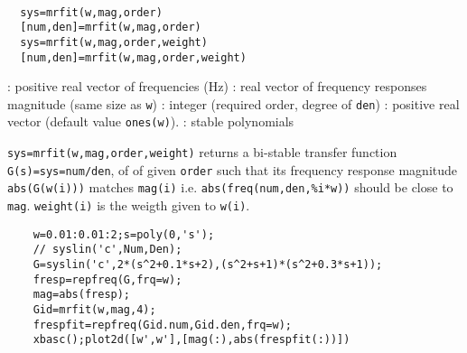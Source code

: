 \begin{mandesc}
   \\ %
\end{mandesc}
\begin{calling_sequence}
\begin{verbatim}
  sys=mrfit(w,mag,order)  
  [num,den]=mrfit(w,mag,order)  
  sys=mrfit(w,mag,order,weight)  
  [num,den]=mrfit(w,mag,order,weight)  
\end{verbatim}
\end{calling_sequence}
\begin{parameters}
  \begin{varlist}
    : positive real vector of frequencies (Hz)
    : real vector of frequency responses magnitude (same size as \verb!w!)
    : integer (required order, degree of \verb!den!)
    : positive real vector (default value \verb!ones(w)!).
    : stable polynomials
  \end{varlist}
\end{parameters}
\begin{mandescription}
  \verb!sys=mrfit(w,mag,order,weight)! returns a bi-stable transfer function
  \verb!G(s)=sys=num/den!, of of given \verb!order! such that 
  its frequency response magnitude \verb!abs(G(w(i)))! 
  matches \verb!mag(i)! i.e. \verb!abs(freq(num,den,%i*w))! should be 
  close to \verb!mag!.
  \verb!weight(i)! is the weigth given to \verb!w(i)!.
\end{mandescription}
\begin{examples}
  \begin{Verbatim}
    w=0.01:0.01:2;s=poly(0,'s');
    // syslin('c',Num,Den);
    G=syslin('c',2*(s^2+0.1*s+2),(s^2+s+1)*(s^2+0.3*s+1)); 
    fresp=repfreq(G,frq=w);
    mag=abs(fresp);
    Gid=mrfit(w,mag,4);
    frespfit=repfreq(Gid.num,Gid.den,frq=w);
    xbasc();plot2d([w',w'],[mag(:),abs(frespfit(:))])
  \end{Verbatim}
\end{examples}
\begin{manseealso}
    
     
\end{manseealso}
